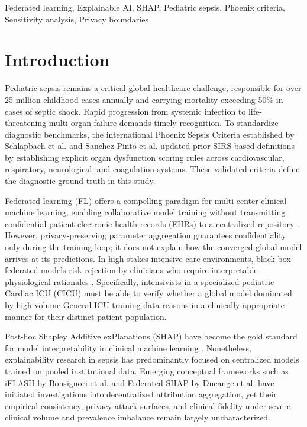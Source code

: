 \documentclass[conference,a4paper]{IEEEtran}
\begin{document}
\begin{IEEEkeywords}
Federated learning, Explainable AI, SHAP, Pediatric sepsis, Phoenix criteria, Sensitivity analysis, Privacy boundaries
\end{IEEEkeywords}

\section{Introduction}\label{sec:intro}

Pediatric sepsis remains a critical global healthcare challenge, responsible for over 25 million childhood cases annually and carrying mortality exceeding 50\% in cases of septic shock. Rapid progression from systemic infection to life-threatening multi-organ failure demands timely recognition. To standardize diagnostic benchmarks, the international Phoenix Sepsis Criteria established by Schlapbach et al. \cite{schlapbach2024phoenix} and Sanchez-Pinto et al. \cite{sanchezpinto2024phoenix} updated prior SIRS-based definitions \cite{goldstein2005sirs} by establishing explicit organ dysfunction scoring rules across cardiovascular, respiratory, neurological, and coagulation systems. These validated criteria define the diagnostic ground truth in this study.

Federated learning (FL) offers a compelling paradigm for multi-center clinical machine learning, enabling collaborative model training without transmitting confidential patient electronic health records (EHRs) to a centralized repository \cite{mcmahan2017fedavg,li2020fedprox}. However, privacy-preserving parameter aggregation guarantees confidentiality only during the training loop; it does not explain how the converged global model arrives at its predictions. In high-stakes intensive care environments, black-box federated models risk rejection by clinicians who require interpretable physiological rationales \cite{athukorala2026explainable}. Specifically, intensivists in a specialized pediatric Cardiac ICU (CICU) must be able to verify whether a global model dominated by high-volume General ICU training data reasons in a clinically appropriate manner for their distinct patient population.

Post-hoc Shapley Additive exPlanations (SHAP) \cite{lundberg2017shap} have become the gold standard for model interpretability in clinical machine learning \cite{athukorala2026explainable,chanci2025machine}. Nonetheless, explainability research in sepsis has predominantly focused on centralized models trained on pooled institutional data. Emerging conceptual frameworks such as iFLASH by Bonsignori et al. \cite{bonsignori2026interpreting} and Federated SHAP by Ducange et al. \cite{ducange2026federated} have initiated investigations into decentralized attribution aggregation, yet their empirical consistency, privacy attack surfaces, and clinical fidelity under severe clinical volume and prevalence imbalance remain largely uncharacterized.
\end{document}
